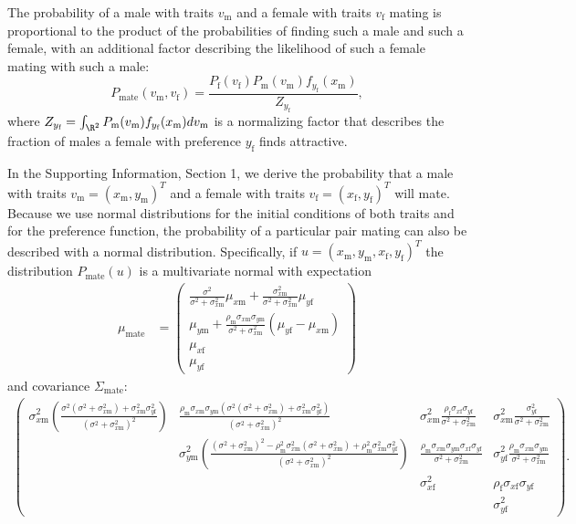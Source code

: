 \documentclass[12pt]{article}
\newcommand{\x}[1]{\text{#1}}
\begin{document}
The probability of a male with traits $v_\x{m}$ and a female with traits $v_\x{f}$ mating is proportional to the product of the probabilities of finding such a male and such a female, with an additional factor describing the likelihood of such a female mating with such a male:
\begin{equation} \label{model}
P_\x{mate}(v_\x{m},v_\x{f})=\frac{P_\x{f}(v_\x{f})P_\x{m}(v_\x{m})f_{y_\x{f}}(x_\x{m})}{Z_{y_\x{f}}},
\end{equation}
where $Z_{y_\x{f}}=\int_{\R^2} P_\x{m}(v_\x{m})f_{y_\x{f}}(x_\x{m})dv_\x{m}$ is a normalizing factor that describes the fraction of males a female with preference $y_\x{f}$ finds attractive.

In the Supporting Information, Section 1, we derive the probability that a male with traits $v_\x{m}=(x_\x{m},y_\x{m})^T$ and a female with traits $v_\x{f}=(x_\x{f},y_\x{f})^T$ will mate. Because we use normal distributions for the initial conditions of both traits and for the preference function, the probability of a particular pair mating can also be described with a normal distribution. Specifically, if $u=(x_\x{m},y_\x{m},x_\x{f},y_\x{f})^T$ the distribution $P_\text{mate}(u)$ is a multivariate normal with expectation 
\begin{align}
\mu_\text{mate}&=\left(\begin{array}{cc} \frac{\sigma^2}{\sigma^2+\sigma_{x\x{m}}^2}\mu_{x\x{m}}+\frac{\sigma_{x\x{m}}^2}{\sigma^2+\sigma_{x\x{m}}^2}\mu_{y\x{f}} 
\\ \mu_{y\x{m}}+\frac{\rho_\x{m}\sigma_{x\x{m}}\sigma_{y\x{m}}}{\sigma^2+\sigma_{x\x{m}}^2}(\mu_{y\x{f}}-\mu_{x\x{m}})
\\ \mu_{x\x{f}}
\\ \mu_{y\x{f}}
 \end{array}\right) \label{mean}
\end{align}
and covariance $\Sigma_\text{mate}$:
\begin{align}
\left(\begin{array}{cccc}\sigma_{x\x{m}}^2\left(\frac{\sigma^2(\sigma^2+\sigma_{x\x{m}}^2)+\sigma_{x\x{m}}^2\sigma_{y\x{f}}^2}{(\sigma^2+\sigma_{x\x{m}}^2)^2}\right) & \frac{\rho_\x{m}\sigma_{x\x{m}}\sigma_{y\x{m}}(\sigma^2(\sigma^2+\sigma_{x\x{m}}^2)+\sigma_{x\x{m}}^2\sigma_{y\x{f}}^2)}{(\sigma^2+\sigma_{x\x{m}}^2)^2} & \sigma_{x\x{m}}^2\frac{\rho_\x{f}\sigma_{x\x{f}}\sigma_{y\x{f}}}{\sigma^2+\sigma_{x\x{m}}^2} &  \sigma_{x\x{m}}^2\frac{\sigma_{y\x{f}}^2}{\sigma^2+\sigma_{x\x{m}}^2}
\\ & \sigma_{y\x{m}}^2\left(\frac{(\sigma^2+\sigma_{x\x{m}}^2)^2-\rho_\x{m}^2\sigma_{x\x{m}}^2(\sigma^2+\sigma_{x\x{m}}^2)+\rho_\x{m}^2\sigma_{x\x{m}}^2\sigma_{y\x{f}}^2}{(\sigma^2+\sigma_{x\x{m}}^2)^2}\right) & \frac{\rho_\x{m}\sigma_{x\x{m}}\sigma_{y\x{m}}\sigma_{x\x{f}}\sigma_{y\x{f}}}{\sigma^2+\sigma_{x\x{m}}^2}& \sigma_{y\x{f}}^2\frac{\rho_\x{m}\sigma_{x\x{m}}\sigma_{y\x{m}}}{\sigma^2+\sigma_{x\x{m}}^2}
\\ & & \sigma_{x\x{f}}^2 & \rho_\x{f}\sigma_{x\x{f}}\sigma_{y\x{f}}
\\ & & & \sigma_{y\x{f}}^2
\end{array}\right). \label{covariance}
\end{align}
\end{document}
